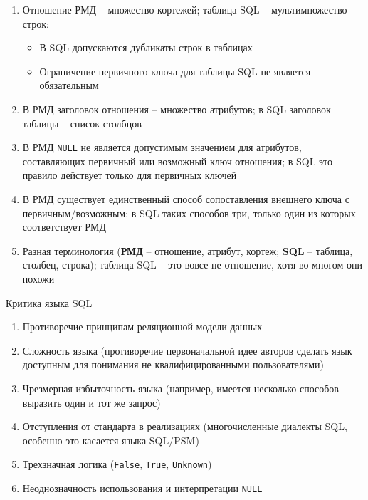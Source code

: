 \documentclass[a4paper,12pt]{article}
\begin{document}
\begin{enumerate}
\item Отношение РМД – множество кортежей; таблица SQL – мультимножество строк:
  \begin{itemize}
  \item В SQL допускаются дубликаты строк в таблицах
  \item Ограничение первичного ключа для таблицы SQL не является обязательным
  \end{itemize}
\item В РМД заголовок отношения – множество атрибутов; в SQL заголовок таблицы – список столбцов
\item В РМД \texttt{NULL} не является допустимым значением для атрибутов, составляющих первичный или возможный ключ отношения; в SQL это правило действует только для первичных ключей
\item В РМД существует единственный способ сопоставления внешнего ключа с первичным/возможным; в SQL таких способов три, только один из которых соответствует РМД
\item Разная терминология (\textbf{РМД} – отношение, атрибут, кортеж; \textbf{SQL} – таблица, столбец, строка); таблица SQL – это вовсе не отношение, хотя во многом они похожи
\end{enumerate}

Критика языка SQL  
\begin{enumerate}
\item Противоречие принципам реляционной модели данных
\item Сложность языка (противоречие первоначальной идее авторов сделать язык доступным для понимания не квалифицированными пользователями)
\item Чрезмерная избыточность языка (например, имеется несколько способов выразить один и тот же запрос)
\item Отступления от стандарта в реализациях (многочисленные диалекты SQL, особенно это касается языка SQL/PSM)
\item Трехзначная логика (\texttt{False}, \texttt{True}, \texttt{Unknown})
\item Неоднозначность использования и интерпретации \texttt{NULL}
\end{enumerate}
\end{document}

